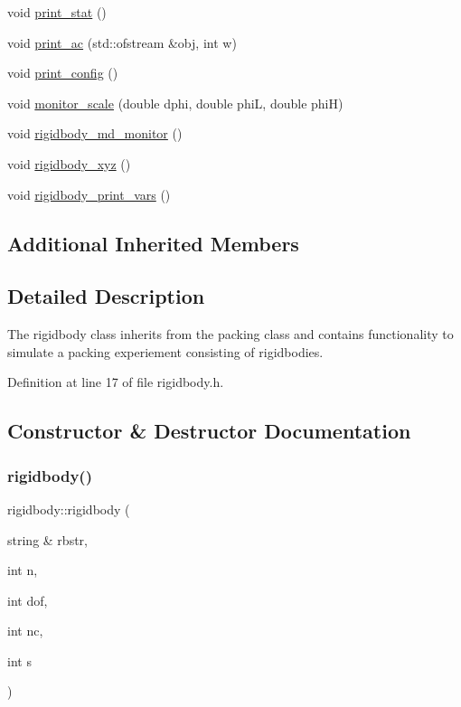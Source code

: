 \begin{DoxyCompactItemize}
void \mbox{\hyperlink{classrigidbody_aa00fc3768317e6852643a37cbe19c76a}{print\+\_\+stat}} ()
\item 
void \mbox{\hyperlink{classrigidbody_a24ffb7711348dc2813b8c07e899d065f}{print\+\_\+ac}} (std\+::ofstream \&obj, int w)
\item 
void \mbox{\hyperlink{classrigidbody_aa486e3fa6409f5031188193e37eadc10}{print\+\_\+config}} ()
\item 
void \mbox{\hyperlink{classrigidbody_aecb6c9283be568ba2c303d82d174d987}{monitor\+\_\+scale}} (double dphi, double phiL, double phiH)
\item 
void \mbox{\hyperlink{classrigidbody_a0af56b5a8e3c6550c9a45b6a59c262ef}{rigidbody\+\_\+md\+\_\+monitor}} ()
\item 
void \mbox{\hyperlink{classrigidbody_a05123548826f40f3737bd9f0fce21a85}{rigidbody\+\_\+xyz}} ()
\item 
void \mbox{\hyperlink{classrigidbody_ae7af1f93b40b47c9e855bcb0adb74434}{rigidbody\+\_\+print\+\_\+vars}} ()
\end{DoxyCompactItemize}
\subsection*{Additional Inherited Members}


\subsection{Detailed Description}
The rigidbody class inherits from the packing class and contains functionality to simulate a packing experiement consisting of rigidbodies. 

Definition at line 17 of file rigidbody.\+h.



\subsection{Constructor \& Destructor Documentation}
\mbox{\label{classrigidbody_a2d1f12365075606f81a18c3ce9454246}} 
\subsubsection{\texorpdfstring{rigidbody()}{rigidbody()}}
{\footnotesize\ttfamily rigidbody\+::rigidbody (\begin{DoxyParamCaption}\item[{string \&}]{rbstr,  }\item[{int}]{n,  }\item[{int}]{dof,  }\item[{int}]{nc,  }\item[{int}]{s }\end{DoxyParamCaption})}



